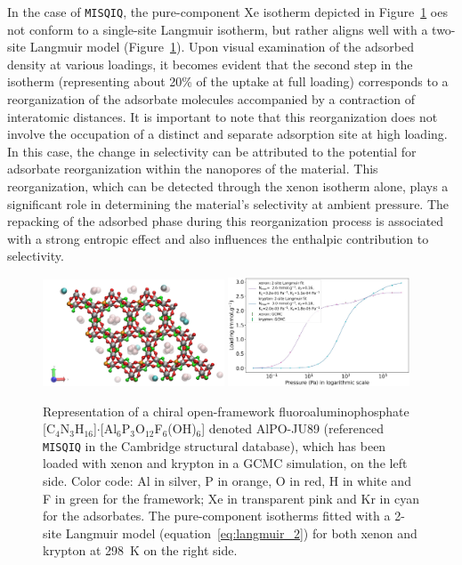 \documentclass[main.tex]{subfiles}
\begin{document}
In the case of \texttt{MISQIQ}, the pure-component Xe isotherm depicted in Figure~\ref{fgr:MISQIQ} oes not conform to a single-site Langmuir isotherm, but rather aligns well with a two-site Langmuir model (Figure~\ref{fgr:MISQIQ}). Upon visual examination of the adsorbed density at various loadings, it becomes evident that the second step in the isotherm (representing about {20\%} of the uptake at full loading) corresponds to a reorganization of the adsorbate molecules accompanied by a contraction of interatomic distances. It is important to note that this reorganization does not involve the occupation of a distinct and separate adsorption site at high loading. In this case, the change in selectivity can be attributed to the potential for adsorbate reorganization within the nanopores of the material. This reorganization, which can be detected through the xenon isotherm alone, plays a significant role in determining the material's selectivity at ambient pressure. The repacking of the adsorbed phase during this reorganization process is associated with a strong entropic effect and also influences the enthalpic contribution to selectivity.

\begin{figure}[t]
  \centering
    \includegraphics[width=0.48\textwidth]{figures/2-thermo/MISQIQ_clean.jpg}\hfill
    \includegraphics[width=0.48\textwidth]{figures/2-thermo/MISQIQ_clean_isotherm_xenon_krypton_298K.jpg}
    \caption{Representation of a chiral open-framework fluoroaluminophosphate [C$_4$N$_3$H$_{16}$]$\cdot$[Al$_6$P$_3$O$_{12}$F$_6$(OH)$_6$] denoted AlPO-JU89 (referenced \texttt{MISQIQ} in the Cambridge structural database), which has been loaded with xenon and krypton in a GCMC simulation, on the left side.\autocite{MISQIQ} Color code: Al in silver, P in orange, O in red, H in white and F in green for the framework; Xe in transparent pink and Kr in cyan for the adsorbates. The pure-component isotherms fitted with a 2-site Langmuir model (equation~\ref{eq:langmuir_2}) for both xenon and krypton at \SI{298}{\kelvin} on the right side.}\label{fgr:MISQIQ}
  \end{figure}
\end{document}
